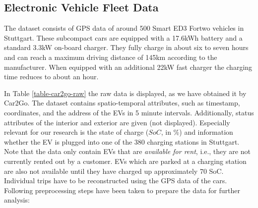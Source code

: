 \documentclass[a4paper, 12pt]{article}
\begin{document}
\subsection{Electronic Vehicle Fleet Data}
\label{sec:org4b62650}
The dataset consists of GPS data of around 500 Smart ED3 Fortwo vehicles in
Stuttgart. These subcompact cars are equipped with a 17.6kWh battery and a
standard 3.3kW on-board charger. They fully charge in about six to seven hours
and can reach a maximum driving distance of 145km according to the manufacturer.
When equipped with an additional 22kW fast charger the charging time reduces to
about an hour.

In Table \ref{table-car2go-raw} the raw data is displayed, as we have obtained it
by Car2Go. The dataset contains spatio-temporal attributes, such as timestamp,
coordinates, and the address of the EVs in 5 minute intervals. Additionally,
status attributes of the interior and exterior are given (not displayed).
Especially relevant for our research is the state of charge (\(SoC\), in \%) and
information whether the EV is plugged into one of the 380 charging stations in
Stuttgart. Note that the data only contain EVs that are \emph{available for rent},
i.e., they are not currently rented out by a customer. EVs which are parked at a
charging station are also not available until they have charged up approximately
70 SoC. Individual trips have to be reconstructed using the GPS data of the
cars. Following preprocessing steps have been taken to prepare the data for
further analysis:
\end{document}

